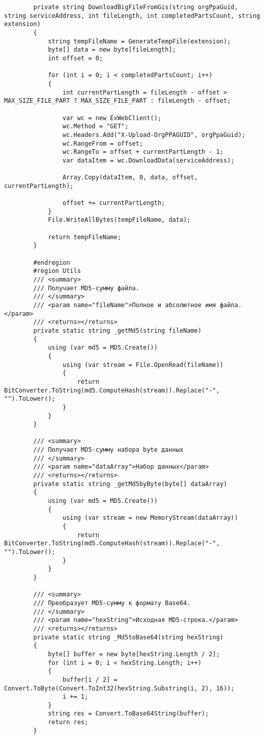 \begin{lstlisting}
        private string DownloadBigFileFromGis(string orgPpaGuid, string serviceAddress, int fileLength, int completedPartsCount, string extension)
        {
            string tempFileName = GenerateTempFile(extension);
            byte[] data = new byte[fileLength];
            int offset = 0;

            for (int i = 0; i < completedPartsCount; i++)
            {
                int currentPartLength = fileLength - offset > MAX_SIZE_FILE_PART ? MAX_SIZE_FILE_PART : fileLength - offset;

                var wc = new ExWebClient();
                wc.Method = "GET";
                wc.Headers.Add("X-Upload-OrgPPAGUID", orgPpaGuid);
                wc.RangeFrom = offset;
                wc.RangeTo = offset + currentPartLength - 1;
                var dataItem = wc.DownloadData(serviceAddress);

                Array.Copy(dataItem, 0, data, offset, currentPartLength);

                offset += currentPartLength;
            }
            File.WriteAllBytes(tempFileName, data);

            return tempFileName;
        }

        #endregion
        #region Utils
        /// <summary>
        /// Получает MD5-сумму файла.
        /// </summary>
        /// <param name="fileName">Полное и абсолютное имя файла.</param>
        /// <returns></returns>
        private static string _getMd5(string fileName)
        {
            using (var md5 = MD5.Create())
            {
                using (var stream = File.OpenRead(fileName))
                {
                    return BitConverter.ToString(md5.ComputeHash(stream)).Replace("-", "").ToLower();
                }
            }
        }

        /// <summary>
        /// Получает MD5-сумму набора byte данных
        /// </summary>
        /// <param name="dataArray">Набор данных</param>
        /// <returns></returns>
        private static string _getMd5byByte(byte[] dataArray)
        {
            using (var md5 = MD5.Create())
            {
                using (var stream = new MemoryStream(dataArray))
                {
                    return BitConverter.ToString(md5.ComputeHash(stream)).Replace("-", "").ToLower();
                }
            }
        }

        /// <summary>
        /// Преобразует MD5-сумму к формату Base64.
        /// </summary>
        /// <param name="hexString">Исходная MD5-строка.</param>
        /// <returns></returns>
        private static string _Md5toBase64(string hexString)
        {
            byte[] buffer = new byte[hexString.Length / 2];
            for (int i = 0; i < hexString.Length; i++)
            {
                buffer[i / 2] = Convert.ToByte(Convert.ToInt32(hexString.Substring(i, 2), 16));
                i += 1;
            }
            string res = Convert.ToBase64String(buffer);
            return res;
        }


\end{lstlisting}
